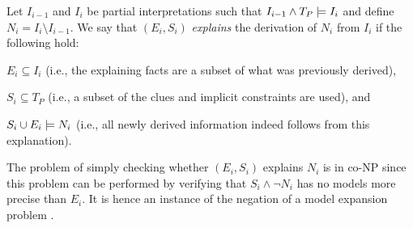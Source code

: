 % 



\begin{definition}
 Let $I_{i-1}$ and $I_i$ be partial interpretations such that $I_{i-1}\land T_P \models I_i$ and define $N_i= I_i \setminus I_{i-1}$. 
 We say that $(E_i,S_i)$ \emph{explains} the derivation of $N_i$ from $I_i$ if the following hold:
\begin{compactitem}
	\item $E_i\subseteq I_i$ (i.e., the explaining facts are a subset of what was previously derived),
	\item $S_i \subseteq T_P$ (i.e., a subset of the clues and implicit constraints are used), and 
	\item $S_i \cup E_i \models N_i$ (i.e., all newly derived information indeed follows from this explanation).
\end{compactitem}
\end{definition}

The problem of simply checking whether $(E_i,S_i)$ explains $N_i$ is in co-NP since this problem can be performed by verifying that $S_i \land \lnot N_i$ has no models more precise than $E_i$. It is hence an instance of the negation of a model expansion problem \cite{DBLP:conf/lpar/KolokolovaLMT10}.

